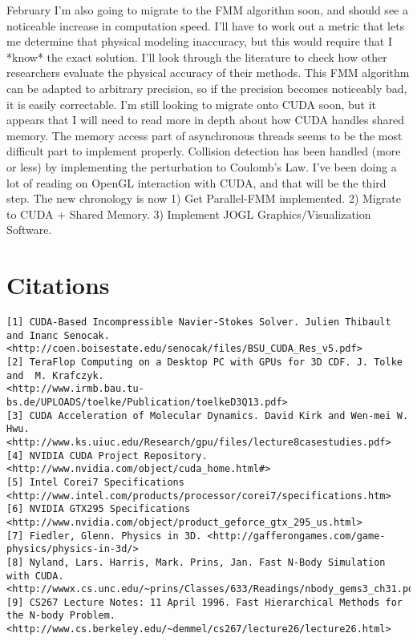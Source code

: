 \documentclass[10pt]{article}
\begin{document}
February
I'm also going to migrate to the FMM algorithm soon, and should see a noticeable increase in computation speed. I'll have to work out a metric that lets me determine that physical modeling inaccuracy, but this would require that I *know* the exact solution. I'll look through the literature to check how other researchers evaluate the physical accuracy of their methods. This FMM algorithm can be adapted to arbitrary precision, so if the precision becomes noticeably bad, it is easily correctable. I'm still looking to migrate onto CUDA soon, but it appears that I will need to read more in depth about how CUDA handles shared memory. The memory access part of asynchronous threads seems to be the most difficult part to implement properly. Collision detection has been handled (more or less) by implementing the perturbation to Coulomb's Law. I've been doing a lot of reading on OpenGL interaction with CUDA, and that will be the third step. The new chronology is now 1) Get Parallel-FMM implemented. 2) Migrate to CUDA + Shared Memory. 3) Implement JOGL Graphics/Visualization Software.


\section{Citations}


\begin{verbatim}
[1] CUDA-Based Incompressible Navier-Stokes Solver. Julien Thibault and Inanc Senocak.
<http://coen.boisestate.edu/senocak/files/BSU_CUDA_Res_v5.pdf>
[2] TeraFlop Computing on a Desktop PC with GPUs for 3D CDF. J. Tolke and  M. Krafczyk.  
<http://www.irmb.bau.tu-bs.de/UPLOADS/toelke/Publication/toelkeD3Q13.pdf>
[3] CUDA Acceleration of Molecular Dynamics. David Kirk and Wen-mei W. Hwu.  
<http://www.ks.uiuc.edu/Research/gpu/files/lecture8casestudies.pdf>
[4] NVIDIA CUDA Project Repository. <http://www.nvidia.com/object/cuda_home.html#>
[5] Intel Corei7 Specifications <http://www.intel.com/products/processor/corei7/specifications.htm>
[6] NVIDIA GTX295 Specifications <http://www.nvidia.com/object/product_geforce_gtx_295_us.html>
[7] Fiedler, Glenn. Physics in 3D. <http://gafferongames.com/game-physics/physics-in-3d/>
[8] Nyland, Lars. Harris, Mark. Prins, Jan. Fast N-Body Simulation with CUDA. 
<http://wwwx.cs.unc.edu/~prins/Classes/633/Readings/nbody_gems3_ch31.pdf>
[9] CS267 Lecture Notes: 11 April 1996. Fast Hierarchical Methods for the N-body Problem.
<http://www.cs.berkeley.edu/~demmel/cs267/lecture26/lecture26.html>
\end{verbatim}
\end{document}
